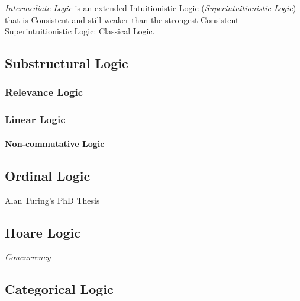 \documentclass{article}
\begin{document}
\emph{Intermediate Logic} is an extended Intuitionistic Logic
(\emph{Superintuitionistic Logic}) that is Consistent and still weaker
than the strongest Consistent Superintuitionistic Logic: Classical
Logic.

\subsection{Substructural Logic}\label{subsec:substructural_logic}

\subsubsection{Relevance Logic}\label{subsec:relevance_logic}

\subsubsection{Linear Logic}\label{subsec:linear_logic}

\paragraph{Non-commutative Logic}\label{subsec:noncommutative_logic}

\subsection{Ordinal Logic}

Alan Turing's PhD Thesis \cite{turing38}

\subsection{Hoare Logic}

\emph{Concurrency}

\subsection{Categorical Logic}
\end{document}
